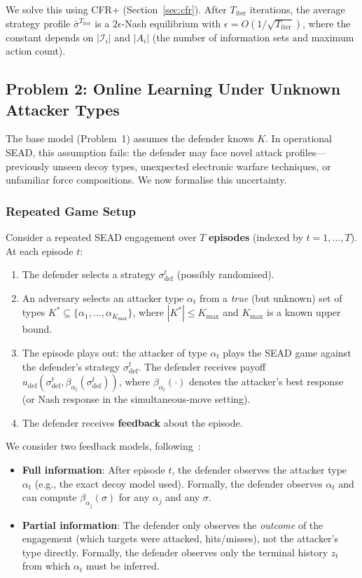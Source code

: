 \documentclass[sigconf]{aamas}
\newcommand{\Kmax}{K_{\max}}
\begin{document}
We solve this using CFR+ (Section~\ref{sec:cfr}). After $T_{\mathrm{iter}}$ iterations, the average strategy profile $\bar{\sigma}^{T_{\mathrm{iter}}}$ is a $2\epsilon$-Nash equilibrium with $\epsilon = O(1/\sqrt{T_{\mathrm{iter}}})$, where the constant depends on $|\mathcal{I}_i|$ and $|A_i|$ (the number of information sets and maximum action count).

\subsection{Problem 2: Online Learning Under Unknown Attacker Types}
\label{sec:problem2}

The base model (Problem~1) assumes the defender knows $K$. In operational SEAD, this assumption fails: the defender may face novel attack profiles---previously unseen decoy types, unexpected electronic warfare techniques, or unfamiliar force compositions. We now formalise this uncertainty.

\subsubsection{Repeated Game Setup}
Consider a repeated SEAD engagement over $T$ \textbf{episodes} (indexed by $t = 1, \ldots, T$). At each episode $t$:
\begin{enumerate}
    \item The defender selects a strategy $\sigma_{\mathrm{def}}^t$ (possibly randomised).
    \item An adversary selects an attacker type $\alpha_t$ from a \emph{true} (but unknown) set of types $K^* \subseteq \{\alpha_1, \ldots, \alpha_{\Kmax}\}$, where $|K^*| \leq \Kmax$ and $\Kmax$ is a known upper bound.
    \item The episode plays out: the attacker of type $\alpha_t$ plays the SEAD game against the defender's strategy $\sigma_{\mathrm{def}}^t$. The defender receives payoff $u_{\mathrm{def}}(\sigma_{\mathrm{def}}^t, \beta_{\alpha_t}(\sigma_{\mathrm{def}}^t))$, where $\beta_{\alpha_t}(\cdot)$ denotes the attacker's best response (or Nash response in the simultaneous-move setting).
    \item The defender receives \textbf{feedback} about the episode.
\end{enumerate}

We consider two feedback models, following~\cite{Balcan2015}:
\begin{itemize}
    \item \textbf{Full information}: After episode $t$, the defender observes the attacker type $\alpha_t$ (e.g., the exact decoy model used). Formally, the defender observes $\alpha_t$ and can compute $\beta_{\alpha_j}(\sigma)$ for any $\alpha_j$ and any $\sigma$.
    \item \textbf{Partial information}: The defender only observes the \emph{outcome} of the engagement (which targets were attacked, hits/misses), not the attacker's type directly. Formally, the defender observes only the terminal history $z_t$ from which $\alpha_t$ must be inferred.
\end{itemize}
\end{document}
